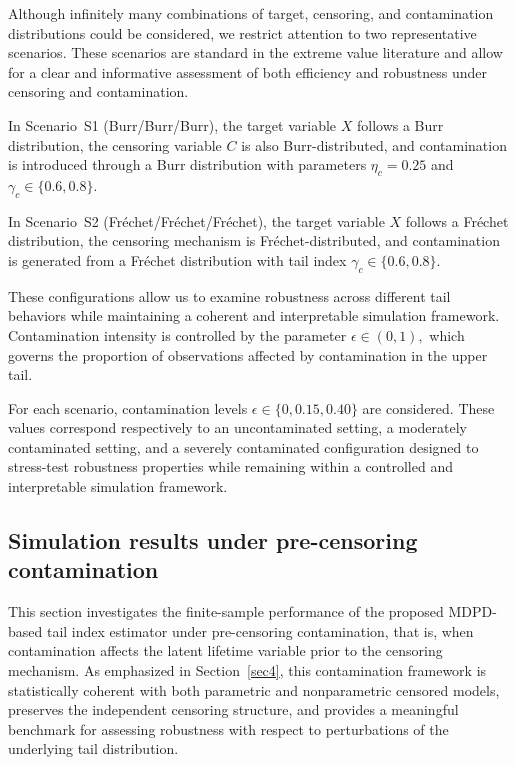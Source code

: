 \documentclass[reqno,openbib,runningheads,a4paper,12pt]{amsart}%
\begin{document}
\noindent Although infinitely many combinations of target, censoring, and
contamination distributions could be considered, we restrict attention to two
representative scenarios. These scenarios are standard in the extreme value
literature and allow for a clear and informative assessment of both efficiency
and robustness under censoring and contamination.\smallskip

\noindent In Scenario~S1 (Burr/Burr/Burr), the target variable $X$ follows a
Burr distribution, the censoring variable $C$ is also Burr-distributed, and
contamination is introduced through a Burr distribution with parameters
$\eta_{c}=0.25$ and $\gamma_{c}\in\{0.6,0.8\}.$\smallskip

\noindent In Scenario~S2 (Fr\'{e}chet/Fr\'{e}chet/Fr\'{e}chet), the target
variable $X$ follows a Fr\'{e}chet distribution, the censoring mechanism is
Fr\'{e}chet-distributed, and contamination is generated from a Fr\'{e}chet
distribution with tail index $\gamma_{c}\in\{0.6,0.8\}.$\smallskip

\noindent These configurations allow us to examine robustness across different
tail behaviors while maintaining a coherent and interpretable simulation
framework. Contamination intensity is controlled by the parameter $\epsilon
\in(0,1),$ which governs the proportion of observations affected by
contamination in the upper tail.\smallskip

\noindent For each scenario, contamination levels $\epsilon\in\{0,0.15,0.40\}$
are considered. These values correspond respectively to an uncontaminated
setting, a moderately contaminated setting, and a severely contaminated
configuration designed to stress-test robustness properties while remaining
within a controlled and interpretable simulation framework.

\subsection{Simulation results under pre-censoring contamination}

\noindent This section investigates the finite-sample performance of the
proposed MDPD-based tail index estimator under pre-censoring contamination,
that is, when contamination affects the latent lifetime variable prior to the
censoring mechanism. As emphasized in Section~\ref{sec4}, this contamination
framework is statistically coherent with both parametric and nonparametric
censored models, preserves the independent censoring structure, and provides a
meaningful benchmark for assessing robustness with respect to perturbations of
the underlying tail distribution.
\end{document}
